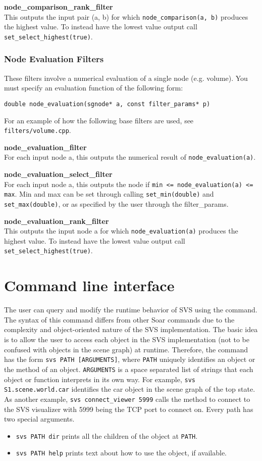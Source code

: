 \textbf{node\_comparison\_rank\_filter} \\
This outputs the input pair (a, b) for which \texttt{node\_comparison(a, b)} 
produces the highest value. To instead have the lowest value output call \texttt{set\_select\_highest(true)}.


\subsubsection{Node Evaluation Filters}
These filters involve a numerical evaluation of a single node (e.g. volume). 
You must specify an evaluation function of the following form:
\begin{verbatim}
double node_evaluation(sgnode* a, const filter_params* p)
\end{verbatim}

For an example of how the following base filters are used, see \texttt{filters/volume.cpp}.

\textbf{node\_evaluation\_filter} \\
For each input node a, this outputs the numerical result of \texttt{node\_evaluation(a)}. 

\textbf{node\_evaluation\_select\_filter} \\
For each input node a, this outputs the node if 
\texttt{min <= node\_evaluation(a) <= max}. 
Min and max can be set through calling \texttt{set\_min(double)} 
and \texttt{set\_max(double)}, or as specified by the user through the filter\_params. 

\textbf{node\_evaluation\_rank\_filter} \\
This outputs the input node a for which \texttt{node\_evaluation(a)} 
produces the highest value. To instead have the lowest value output call \texttt{set\_select\_highest(true)}.


\section{Command line interface}

The user can query and modify the runtime behavior of SVS using the  command.
The syntax of this command differs from other Soar commands due to the complexity and object-oriented nature of the SVS implementation.
The basic idea is to allow the user to access each object in the SVS implementation (not to be confused with objects in the scene graph) at runtime.
Therefore, the command has the form \texttt{svs PATH [ARGUMENTS]}, where \texttt{PATH} uniquely identifies an object or the method of an object.
\texttt{ARGUMENTS} is a space separated list of strings that each object or function interprets in its own way.
For example, \texttt{svs S1.scene.world.car} identifies the car object 
in the scene graph of the top state.
As another example, \verb|svs connect_viewer 5999| calls the method to connect to the SVS visualizer with 5999 being the TCP port to connect on.
Every path has two special arguments.

\begin{itemize}
\item{\texttt{svs PATH dir}} prints all the children of the object at \texttt{PATH}.
\item{\texttt{svs PATH help}} prints text about how to use the object, if available.
\end{itemize}

